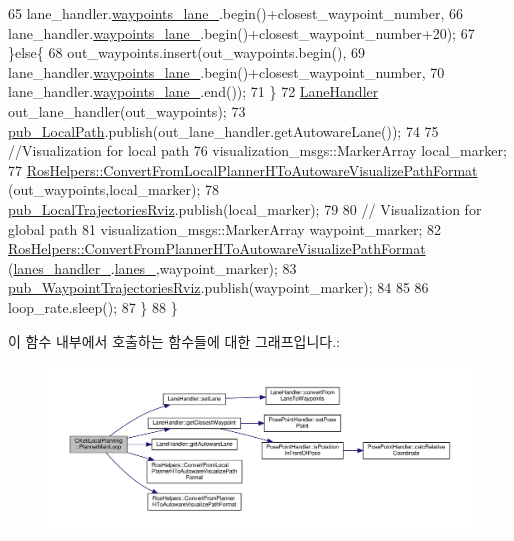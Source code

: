 \begin{DoxyCode}
65                            lane\_handler.\hyperlink{class_lane_handler_ac65a0139b3900a7c8dc3fe49d7a684f3}{waypoints\_lane\_}.begin()+closest\_waypoint\_number,
66                            lane\_handler.\hyperlink{class_lane_handler_ac65a0139b3900a7c8dc3fe49d7a684f3}{waypoints\_lane\_}.begin()+closest\_waypoint\_number+20);
67     \}\textcolor{keywordflow}{else}\{
68       out\_waypoints.insert(out\_waypoints.begin(),
69                            lane\_handler.\hyperlink{class_lane_handler_ac65a0139b3900a7c8dc3fe49d7a684f3}{waypoints\_lane\_}.begin()+closest\_waypoint\_number,
70                            lane\_handler.\hyperlink{class_lane_handler_ac65a0139b3900a7c8dc3fe49d7a684f3}{waypoints\_lane\_}.end());
71     \}
72     \hyperlink{class_lane_handler}{LaneHandler} out\_lane\_handler(out\_waypoints);
73     \hyperlink{class_c_keti_local_planning_a42f394ae6069296e6f412eb5daa9dd3a}{pub\_LocalPath}.publish(out\_lane\_handler.getAutowareLane());
74 
75     \textcolor{comment}{//Visualization for local path}
76     visualization\_msgs::MarkerArray local\_marker;
77     \hyperlink{class_ros_helpers_a00357e856ae16110fd9f3787cc3802d3}{RosHelpers::ConvertFromLocalPlannerHToAutowareVisualizePathFormat}
      (out\_waypoints,local\_marker);
78     \hyperlink{class_c_keti_local_planning_a423ed1137dde91f12793bdcacb4e0bea}{pub\_LocalTrajectoriesRviz}.publish(local\_marker);
79 
80     \textcolor{comment}{// Visualization for global path}
81     visualization\_msgs::MarkerArray waypoint\_marker;
82     \hyperlink{class_ros_helpers_ad82466a16ba11fded30d109a52b75074}{RosHelpers::ConvertFromPlannerHToAutowareVisualizePathFormat}
      (\hyperlink{class_c_keti_local_planning_a6295120665288244397783d747cc60cf}{lanes\_handler\_}.\hyperlink{class_lane_array_handler_a5f6a1e79b64a9092bfad57fd6676432b}{lanes\_},waypoint\_marker);
83     \hyperlink{class_c_keti_local_planning_a54aec2f11f157100a74b09a9cf5fa38b}{pub\_WaypointTrajectoriesRviz}.publish(waypoint\_marker);
84 
85 
86     loop\_rate.sleep();
87   \}
88 \}
\end{DoxyCode}


이 함수 내부에서 호출하는 함수들에 대한 그래프입니다.\+:\nopagebreak
\begin{figure}[H]
\begin{center}
\leavevmode
\includegraphics[width=350pt]{class_c_keti_local_planning_a3286318e734e7441036b43cec169978c_cgraph}
\end{center}
\end{figure}




